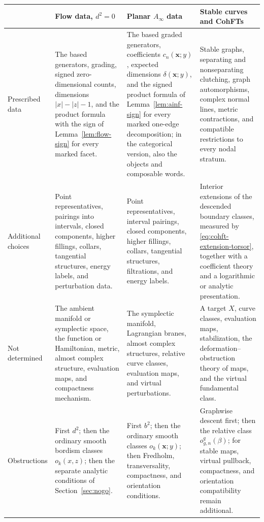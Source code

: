 \documentclass[11pt,letterpaper,twoside]{article}
\theoremstyle{plain}
\theoremstyle{definition}
\theoremstyle{remark}
\newcommand{\Ainf}{A_\infty}
\begin{document}
\begin{table}[p]
\centering
\small
\begin{tabularx}{\textwidth}{@{}>{\bfseries\raggedright\arraybackslash}p{}>{\raggedright\arraybackslash}X>{\raggedright\arraybackslash}X>{\raggedright\arraybackslash}X@{}}
\toprule
 & Flow data, \(d^2=0\) & Planar \(\Ainf\) data & Stable curves and CohFTs \\
\midrule
Prescribed data & The based generators, grading, signed zero-dimensional counts, dimensions \(|x|-|z|-1\), and the product formula with the sign of Lemma~\ref{lem:flow-sign} for every marked facet. & The based graded generators, coefficients \(c_n(\mathbf x;y)\), expected dimensions \(\delta(\mathbf x;y)\), and the signed product formula of Lemma~\ref{lem:ainf-sign} for every marked one-edge decomposition; in the categorical version, also the objects and composable words. & Stable graphs, separating and nonseparating clutching, graph automorphisms, complex normal lines, metric contractions, and compatible restrictions to every nodal stratum. \\
Additional choices & Point representatives, pairings into intervals, closed components, higher fillings, collars, tangential structures, energy labels, and perturbation data. & Point representatives, interval pairings, closed components, higher fillings, collars, tangential structures, filtrations, and energy labels. & Interior extensions of the descended boundary classes, measured by \eqref{eq:cohft-extension-torsor}, together with a coefficient theory and a logarithmic or analytic presentation. \\
Not determined & The ambient manifold or symplectic space, the function or Hamiltonian, metric, almost complex structure, evaluation maps, and compactness mechanism. & The symplectic manifold, Lagrangian branes, almost complex structures, relative curve classes, evaluation maps, and virtual perturbations. & A target \(X\), curve classes, evaluation maps, stabilization, the deformation--obstruction theory of maps, and the virtual fundamental class. \\
Obstructions & First \(d^2\); then the ordinary smooth bordism classes \(o_k(x,z)\); then the separate analytic conditions of Section~\ref{sec:nogo}. & First \(b^2\); then the ordinary smooth classes \(o_k(\mathbf x;y)\); then Fredholm, transversality, compactness, and orientation conditions. & Graphwise descent first; then the relative class \(o^q_{g,n}(\beta)\); for stable maps, virtual pullback, compactness, and orientation compatibility remain additional. \\

\end{tabularx}
\end{table}
\end{document}
